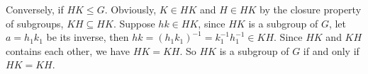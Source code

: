 \documentclass[12pt]{article}
\begin{document}
Conversely, if $HK\le G$. Obviously, $K\in HK$ and $H\in HK$ by the closure property of subgroups, $KH\subseteq HK$. Suppose $hk\in HK$, since $HK$ is a subgroup of $G$, let $a=h_1k_1$ be its inverse, then $hk=(h_1k_1)^{-1}=k_1^{-1}h_1^{-1}\in KH$. Since $HK$ and $KH$ contains each other, we have $HK=KH$. So $HK$ is a subgroup of $G$ if and only if $HK=KH$.

\subsection{}

\section{}
\end{document}
